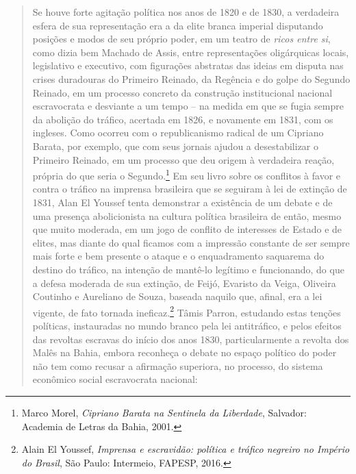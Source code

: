 \begin{quote}
Se houve forte agitação política nos anos de 1820 e de 1830, a
verdadeira esfera de sua representação era a da elite branca imperial
disputando posições e modos de seu próprio poder, em um teatro de
\emph{ricos entre si}, como dizia bem Machado de Assis, entre
representações oligárquicas locais, legislativo e executivo, com
figurações abstratas das ideias em disputa nas crises duradouras do
Primeiro Reinado, da Regência e do golpe do Segundo Reinado, em um
processo concreto da construção institucional nacional escravocrata e
desviante a um tempo -- na medida em que se fugia sempre da abolição do
tráfico, acertada em 1826, e novamente em 1831, com os ingleses. Como
ocorreu com o republicanismo radical de um Cipriano Barata, por exemplo,
que com seus jornais ajudou a desestabilizar o Primeiro Reinado, em um
processo que deu origem à verdadeira reação, própria do que seria o
Segundo.\footnote{Marco Morel, \emph{Cipriano Barata na Sentinela da
  Liberdade}, Salvador: Academia de Letras da Bahia, 2001.} Em seu livro
sobre os conflitos à favor e contra o tráfico na imprensa brasileira que
se seguiram à lei de extinção de 1831, Alan El Youssef tenta demonstrar
a existência de um debate e de uma presença abolicionista na cultura
política brasileira de então, mesmo que muito moderada, em um jogo de
conflito de interesses de Estado e de elites, mas diante do qual ficamos
com a impressão constante de ser sempre mais forte e bem presente o
ataque e o enquadramento saquarema do destino do tráfico, na intenção de
mantê-lo legítimo e funcionando, do que a defesa moderada de sua
extinção, de Feijó, Evaristo da Veiga, Oliveira Coutinho e Aureliano de
Souza, baseada naquilo que, afinal, era a lei vigente, de fato tornada
ineficaz.\footnote{Alain El Youssef, \emph{Imprensa e escravidão:
  política e tráfico negreiro no Império do Brasil}, São Paulo:
  Intermeio, FAPESP, 2016.} Tâmis Parron, estudando estas tenções
políticas, instauradas no mundo branco pela lei antitráfico, e pelos
efeitos das revoltas escravas do início dos anos 1830, particularmente a
revolta dos Malês na Bahia, embora reconheça o debate no espaço político
do poder não tem como recusar a afirmação superiora, no processo, do
sistema econômico social escravocrata nacional:


\end{quote}
